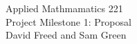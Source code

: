 \documentclass[12pt]{article}
\begin{document}
\begin{center}
Applied Mathmamatics 221\\
Project Milestone 1: Proposal\\
David Freed and Sam Green
\end{center}
\end{document}
